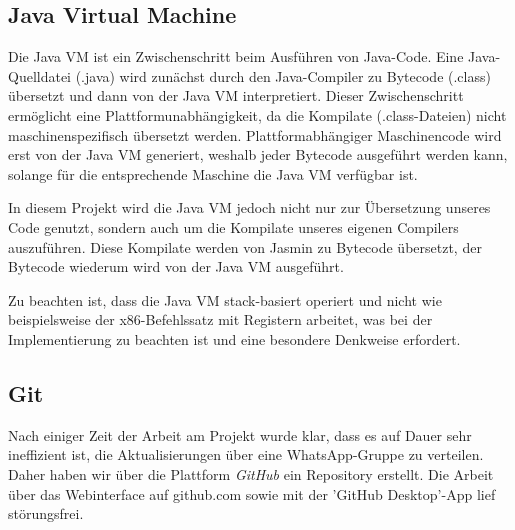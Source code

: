 \subsection{Java Virtual Machine}
Die Java VM ist ein Zwischenschritt beim Ausführen von Java-Code. Eine Java-Quelldatei (.java) wird zunächst durch den Java-Compiler zu Bytecode (.class) übersetzt und dann von der Java VM interpretiert. Dieser Zwischenschritt ermöglicht eine Plattformunabhängigkeit, da die Kompilate (.class-Dateien) nicht maschinenspezifisch übersetzt werden. Plattformabhängiger Maschinencode wird erst von der Java VM generiert, weshalb jeder Bytecode ausgeführt werden kann, solange für die entsprechende Maschine die Java VM verfügbar ist.

In diesem Projekt wird die Java VM jedoch nicht nur zur Übersetzung unseres Code genutzt, sondern auch um die Kompilate unseres eigenen Compilers auszuführen. Diese Kompilate werden von Jasmin zu Bytecode übersetzt, der Bytecode wiederum wird von der Java VM ausgeführt.


Zu beachten ist, dass die Java VM stack-basiert operiert und nicht wie beispielsweise der x86-Befehlssatz mit Registern arbeitet, was bei der Implementierung zu beachten ist und eine besondere Denkweise erfordert. 

\subsection{Git}
Nach einiger Zeit der Arbeit am Projekt wurde klar, dass es auf Dauer sehr ineffizient ist, die Aktualisierungen über eine WhatsApp-Gruppe zu verteilen. Daher haben wir über die Plattform \textit{GitHub} ein Repository erstellt. Die Arbeit über das Webinterface auf github.com sowie mit der 'GitHub Desktop'-App lief störungsfrei.